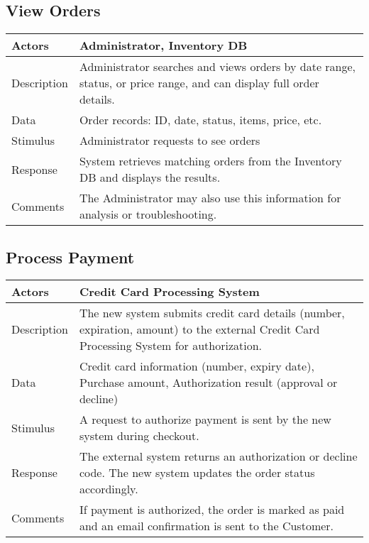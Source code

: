 \documentclass{report}
\begin{document}
    \pagebreak 
    \subsection{View Orders}
    \bigbreak \noindent 
    \begin{center}
        \begin{tabular}{|p{4cm}|p{8cm}|}
            \hline
            Actors & 
            Administrator, Inventory DB \\
            \hline
            Description & 
            Administrator searches and views orders by date range, status, 
            or price range, and can display full order details. \\
            \hline
            Data & 
            Order records: ID, date, status, items, price, etc. \\
            \hline
            Stimulus & 
            Administrator requests to see orders \\
            \hline
            Response & 
            System retrieves matching orders from the Inventory DB and 
            displays the results. \\
            \hline
            Comments & 
            The Administrator may also use this information for analysis 
            or troubleshooting. \\
            \hline
        \end{tabular}
    \end{center}

    \pagebreak 
    \subsection{Process Payment}
    \bigbreak \noindent 
    \begin{center}
        \begin{tabular}{|p{4cm}|p{8cm}|}
            \hline
            Actors & 
            Credit Card Processing System \\
            \hline
            Description & 
            The new system submits credit card details (number, expiration, amount) 
            to the external Credit Card Processing System for authorization. \\
            \hline
            Data & 
            Credit card information (number, expiry date), Purchase amount, Authorization result (approval or decline) \\
            \hline
            Stimulus & 
            A request to authorize payment is sent by the new system 
            during checkout. \\
            \hline
            Response & 
            The external system returns an authorization or decline code. 
            The new system updates the order status accordingly. \\
            \hline
            Comments & 
            If payment is authorized, the order is marked as paid and 
            an email confirmation is sent to the Customer. \\
            \hline
        \end{tabular}
    \end{center}
\end{document}
